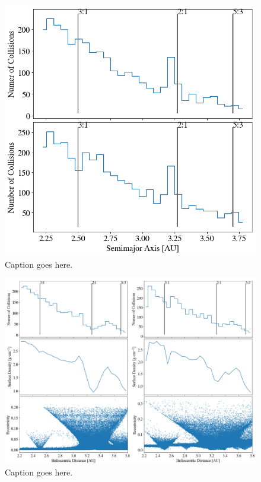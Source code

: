 \documentclass[twocolumn]{aastex63}
\begin{document}
\begin{figure}
    \includegraphics[width=\columnwidth]{figures/coll_hist_a.png}
    \caption{Caption goes here.\label{fig:coll_hist_a}}
\end{figure}

\begin{figure}
    \includegraphics[width=\textwidth]{figures/coll_hist_r.png}
    \caption{Caption goes here.\label{fig:coll_hist_r}}
\end{figure}
\end{document}
